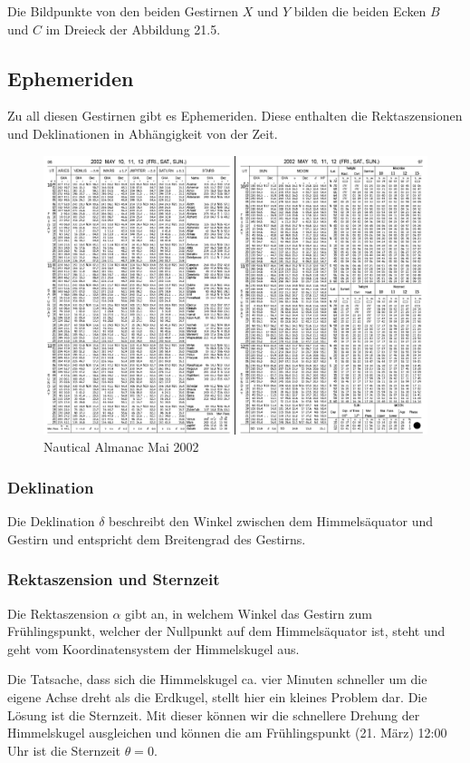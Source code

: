 Die Bildpunkte von den beiden Gestirnen $X$ und $Y$ bilden die beiden Ecken $B$ und $C$ im Dreieck der Abbildung 21.5.
\subsection{Ephemeriden}
Zu all diesen Gestirnen gibt es Ephemeriden. 
Diese enthalten die Rektaszensionen und Deklinationen in Abhängigkeit von der Zeit.

\begin{figure}
	\begin{center}
		\includegraphics[width=\textwidth]{papers/nav/bilder/ephe.png}
		\caption[Nautical Almanac Mai 2002]{Nautical Almanac Mai 2002}
	\end{center}
\end{figure}

\subsubsection{Deklination}
Die Deklination $\delta$ beschreibt den Winkel zwischen dem Himmelsäquator und Gestirn und entspricht dem Breitengrad des Gestirns.

\subsubsection{Rektaszension und Sternzeit}
Die Rektaszension $\alpha$ gibt an, in welchem Winkel das Gestirn zum Frühlingspunkt, welcher der Nullpunkt auf dem Himmelsäquator ist, steht und geht vom Koordinatensystem der Himmelskugel aus.

Die Tatsache, dass sich die Himmelskugel  ca. vier Minuten schneller um die eigene Achse dreht als die Erdkugel, stellt hier ein kleines Problem dar.
Die Lösung ist die Sternzeit. 
Mit dieser können wir die schnellere Drehung der Himmelskugel ausgleichen und können die am Frühlingspunkt (21. März) 12:00 Uhr ist die Sternzeit $\theta = 0$. 

